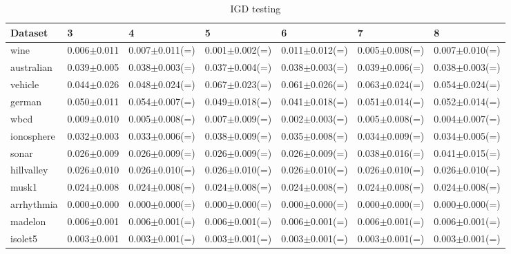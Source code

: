 \documentclass{report}
\begin{document}
\begin{table}
\centering
\scriptsize
\begin{tabular}{lllllll}
\\\hline
Dataset & 3 & 4 & 5 & 6 & 7 & 8\\\hline
wine & 0.006$\pm$0.011 & 0.007$\pm$0.011(=) & 0.001$\pm$0.002(=) & 0.011$\pm$0.012(=) & 0.005$\pm$0.008(=) & 0.007$\pm$0.010(=)\\\hline
australian & 0.039$\pm$0.005 & 0.038$\pm$0.003(=) & 0.037$\pm$0.004(=) & 0.038$\pm$0.003(=) & 0.039$\pm$0.006(=) & 0.038$\pm$0.003(=)\\\hline
vehicle & 0.044$\pm$0.026 & 0.048$\pm$0.024(=) & 0.067$\pm$0.023(=) & 0.061$\pm$0.026(=) & 0.063$\pm$0.024(=) & 0.054$\pm$0.024(=)\\\hline
german & 0.050$\pm$0.011 & 0.054$\pm$0.007(=) & 0.049$\pm$0.018(=) & 0.041$\pm$0.018(=) & 0.051$\pm$0.014(=) & 0.052$\pm$0.014(=)\\\hline
wbcd & 0.009$\pm$0.010 & 0.005$\pm$0.008(=) & 0.007$\pm$0.009(=) & 0.002$\pm$0.003(=) & 0.005$\pm$0.008(=) & 0.004$\pm$0.007(=)\\\hline
ionosphere & 0.032$\pm$0.003 & 0.033$\pm$0.006(=) & 0.038$\pm$0.009(=) & 0.035$\pm$0.008(=) & 0.034$\pm$0.009(=) & 0.034$\pm$0.005(=)\\\hline
sonar & 0.026$\pm$0.009 & 0.026$\pm$0.009(=) & 0.026$\pm$0.009(=) & 0.026$\pm$0.009(=) & 0.038$\pm$0.016(=) & 0.041$\pm$0.015(=)\\\hline
hillvalley & 0.026$\pm$0.010 & 0.026$\pm$0.010(=) & 0.026$\pm$0.010(=) & 0.026$\pm$0.010(=) & 0.026$\pm$0.010(=) & 0.026$\pm$0.010(=)\\\hline
musk1 & 0.024$\pm$0.008 & 0.024$\pm$0.008(=) & 0.024$\pm$0.008(=) & 0.024$\pm$0.008(=) & 0.024$\pm$0.008(=) & 0.024$\pm$0.008(=)\\\hline
arrhythmia & 0.000$\pm$0.000 & 0.000$\pm$0.000(=) & 0.000$\pm$0.000(=) & 0.000$\pm$0.000(=) & 0.000$\pm$0.000(=) & 0.000$\pm$0.000(=)\\\hline
madelon & 0.006$\pm$0.001 & 0.006$\pm$0.001(=) & 0.006$\pm$0.001(=) & 0.006$\pm$0.001(=) & 0.006$\pm$0.001(=) & 0.006$\pm$0.001(=)\\\hline
isolet5 & 0.003$\pm$0.001 & 0.003$\pm$0.001(=) & 0.003$\pm$0.001(=) & 0.003$\pm$0.001(=) & 0.003$\pm$0.001(=) & 0.003$\pm$0.001(=)\\\hline
\end{tabular}
\caption{IGD testing}
\end{table}
\end{document}
